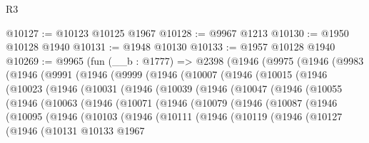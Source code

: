 \begin{lexlean}{R3}
\begin{coremodule}
@10127 := @10123 @10125 @1967
@10128 := @9967 @1213
@10130 := @1950 @10128 @1940
@10131 := @1948 @10130
@10133 := @1957 @10128 @1940
@10269 := @9965
    (fun (__b : @1777) =>
    @2398
      (@1946
        (@9975
          (@1946
            (@9983
              (@1946
                (@9991
                  (@1946
                    (@9999
                      (@1946
                        (@10007
                          (@1946
                            (@10015
                              (@1946
                                (@10023
                                  (@1946
                                    (@10031
                                      (@1946
                                        (@10039
                                          (@1946
                                            (@10047
                                              (@1946
                                                (@10055
                                                  (@1946
                                                    (@10063
                                                      (@1946
                                                        (@10071
                                                          (@1946
                                                            (@10079
                                                              (@1946
                                                                (@10087
                                                                  (@1946
                                                                    (@10095
                                                                      (@1946
                                                                        (@10103
                                                                          (@1946
                                                                            (@10111
                                                                              (@1946
                                                                                (@10119
                                                                                  (@1946
                                                                                    (@10127
                                                                                      (@1946
                                                                                        (@10131
                                                                                          @10133
                                                                                          @1967

\end{coremodule}
\end{lexlean}

